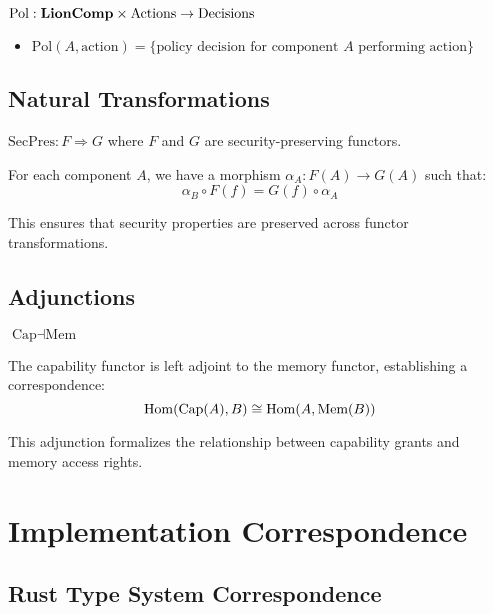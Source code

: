 \begin{definition}
$\text{Pol}: \mathbf{LionComp} \times \text{Actions} \to \text{Decisions}$
\begin{itemize}
\item $\text{Pol}(A, \text{action}) = \{\text{policy decision for component } A \text{ performing action}\}$
\end{itemize}
\end{definition}

\subsection{Natural Transformations}

\begin{definition}
$\text{SecPres}: F \Rightarrow G$ where $F$ and $G$ are security-preserving functors.

For each component $A$, we have a morphism $\alpha_A: F(A) \to G(A)$ such that:
\begin{equation}
\alpha_B \circ F(f) = G(f) \circ \alpha_A
\end{equation}

This ensures that security properties are preserved across functor transformations.
\end{definition}

\subsection{Adjunctions}

\begin{definition}
$\text{Cap} \dashv \text{Mem}$

The capability functor is left adjoint to the memory functor, establishing a correspondence:
\begin{equation}
\mathrm{Hom}(\text{Cap}(A), B) \cong \mathrm{Hom}(A, \text{Mem}(B))
\end{equation}

This adjunction formalizes the relationship between capability grants and memory access rights.
\end{definition}

\newpage

\section{Implementation Correspondence}

\subsection{Rust Type System Correspondence}

